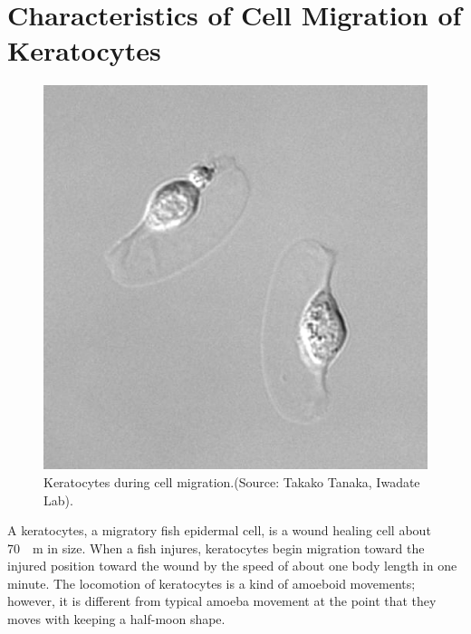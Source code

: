 \documentclass[a4paper,12pt, oneside]{book}
\begin{document}
\section{Characteristics of Cell Migration of Keratocytes}
\begin{figure}[tbp]
\centering
\includegraphics[scale=0.4]{kera.eps}
\caption{Keratocytes during cell migration.(Source: Takako Tanaka, Iwadate Lab).}
\label{fig:kera}
\end{figure}

A keratocytes, a migratory fish epidermal cell, is a wound healing cell about \SI{70}{\mu m}  in size.
When a fish injures, keratocytes begin migration toward the injured position toward  the wound by the speed of about one body length in one minute.
The locomotion of keratocytes is a kind of amoeboid movements;
however, it is different from typical amoeba movement at the point that they moves  with keeping a half-moon shape. 
\end{document}

